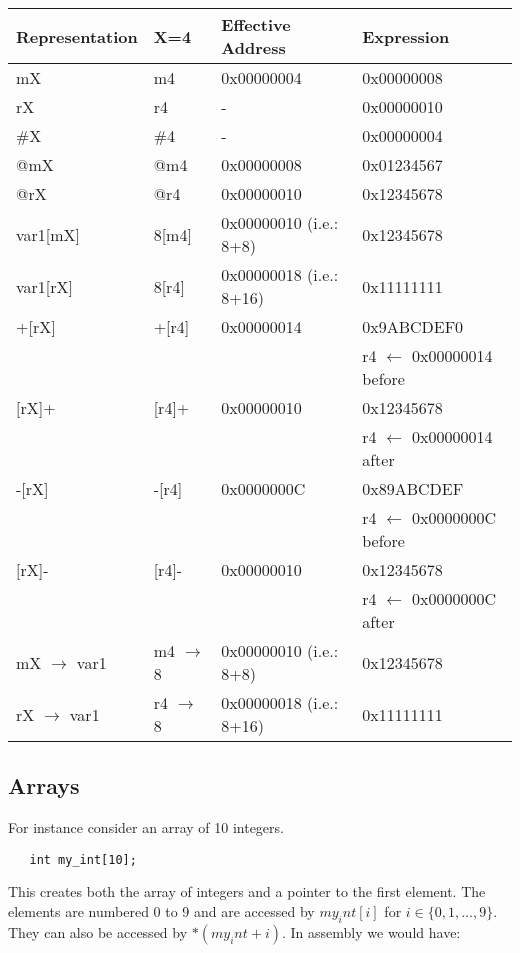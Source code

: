 \vspace{.1in}
\begin{tabular}{llll}
Representation & X=4 & Effective Address & Expression \\ \hline
mX & m4 & 0x00000004 & 0x00000008 \\
rX & r4 & - & 0x00000010 \\
\#X & \#4 & - & 0x00000004 \\
@mX & @m4 & 0x00000008 & 0x01234567 \\
@rX & @r4 & 0x00000010 & 0x12345678 \\
var1[mX] & 8[m4] & 0x00000010 (i.e.: 8+8) & 0x12345678 \\
var1[rX] & 8[r4] & 0x00000018 (i.e.: 8+16) & 0x11111111 \\
+[rX] & +[r4] & 0x00000014 & 0x9ABCDEF0 \\
      &       &  & r4 $\leftarrow$ 0x00000014 before \\
$[$rX]+ & [r4]+ & 0x00000010 & 0x12345678 \\
      &       &  & r4 $\leftarrow$ 0x00000014 after \\
-[rX] & -[r4] & 0x0000000C & 0x89ABCDEF \\
      &       &  & r4 $\leftarrow$ 0x0000000C before \\
$[$rX]- & [r4]- & 0x00000010 & 0x12345678 \\
      &       &  & r4 $\leftarrow$ 0x0000000C after \\
mX $\rightarrow$ var1 & m4 $\rightarrow$ 8 & 0x00000010 (i.e.: 8+8) & 0x12345678 \\
rX $\rightarrow$ var1 & r4 $\rightarrow$ 8 & 0x00000018 (i.e.: 8+16) & 0x11111111 \\
\end{tabular}


\subsection{Arrays}

For instance consider an array of 10 integers.

\begin{verbatim}
   int my_int[10];
\end{verbatim}

This creates both the array of integers and a pointer to the first element.  The elements are numbered 0 to 9 and are accessed by $my_int[i]$ for $i\in\{0,1,\ldots,9\}$.  They can also be accessed by $*(my_int+i)$.  In assembly we would have:

